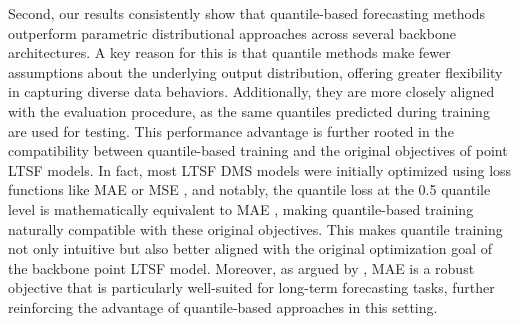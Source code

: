 \documentclass[a4paper,oneside,bibliography=totoc]{scrbook}
\begin{document}
Second, our results consistently show that quantile-based forecasting methods outperform parametric distributional approaches across several backbone architectures. A key reason for this is that quantile methods make fewer assumptions about the underlying output distribution, offering greater flexibility in capturing diverse data behaviors. Additionally, they are more closely aligned with the evaluation procedure, as the same quantiles predicted during training are used for testing.
This performance advantage is further rooted in the compatibility between quantile-based training and the original objectives of point LTSF models. 
In fact, most LTSF DMS models were initially optimized using loss functions like MAE or MSE \cite{zhou_informer_2021, nie_time_2022, zeng_are_2023}, and notably, the quantile loss at the 0.5 quantile level is mathematically equivalent to MAE \cite{gneiting_probabilistic_2014}, making quantile-based training naturally compatible with these original objectives.
This makes quantile training not only intuitive but also better aligned with the original optimization goal of the backbone point LTSF model. Moreover, as argued by \citet{han_capacity_2024}, MAE is a robust objective that is particularly well-suited for long-term forecasting tasks, further reinforcing the advantage of quantile-based approaches in this setting.
\end{document}
